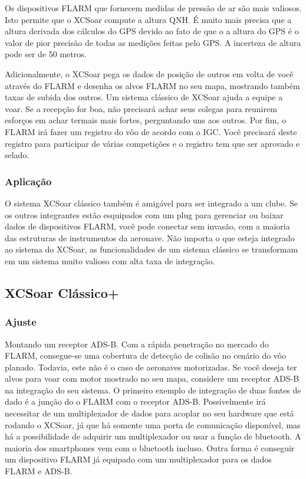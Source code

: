 Os dispositivos FLARM que fornecem medidas de pressão de ar são mais valiosos.  Isto permite que o XCSoar compute a altura QNH.  É muito mais precisa que a altura derivada dos cálculos do GPS devido ao fato de que o a altura do GPS é o valor de pior precisão de todas as medições feitas pelo GPS.  A incerteza de altura pode ser de 50 metros.

Adicionalmente, o XCSoar pega os dados de posição de outros em volta de você através do FLARM e desenha os alvos FLARM no seu mapa, mostrando também taxas de subida dos outros.  Um sistema clássico de XCSoar ajuda a equipe a voar.  Se a recepção for boa, não precisará achar seus colegas para reunirem esforços em achar termais mais fortes, perguntando uns aos outros.  Por fim, o FLARM irá fazer um registro do vôo de acordo com o IGC.  Você precisará deste registro para participar de várias competições e o registro tem que ser aprovado e selado.


\subsubsection*{Aplicação} O sistema XCSoar clássico também é amigável para ser integrado a um clube.  Se os outros integrantes estão esquipados com um plug para gerenciar ou baixar dados de dispositivos FLARM, você pode conectar sem invasão, com a maioria das estruturas de instrumentos da aeronave.  Não importa o que esteja integrado ao sistema do XCSoar, as funcionalidades de um sistema clássico se transformam em um sistema muito valioso com alta taxa de integração.  

\subsection*{XCSoar Clássico+}
\subsubsection*{Ajuste} Montando um receptor ADS-B.  Com a rápida penetração no mercado do FLARM, consegue-se uma cobertura de detecção de colisão no cenário do vôo planado.  Todavia, este não é o caso de aeronaves motorizadas.  Se você deseja ter alvos para voar com motor mostrado no seu mapa, considere um receptor ADS-B na integração do seu sistema.  O primeiro exemplo de integração de duas fontes de dado é a junção do o FLARM com o receptor ADS-B.  Possivelmente irá necessitar de um multiplexador de dados para acoplar no seu hardware que está rodando o XCSoar, já que há somente uma porta de comunicação disponível, mas há a possibilidade de adquirir um multiplexador ou usar a função de bluetooth.  A maioria dos smartphones vem com o bluetooth incluso.  Outra forma é conseguir um dispositivo FLARM já equipado com um multiplexador para os dados FLARM e ADS-B.

